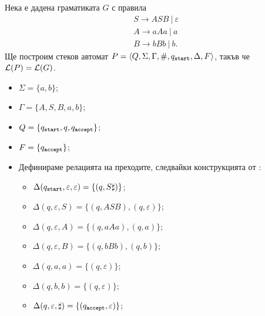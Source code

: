 \begin{example}
  Нека е дадена граматиката $G$ с правила 
  \begin{align*}
    & S \to ASB\ |\ \varepsilon\\
    & A \to aAa\ |\ a\\
    & B \to bBb\ |\ b.
  \end{align*}
  Ще построим стеков автомат $P = \langle{Q,\Sigma,\Gamma,\#,q_{\texttt{start}},\Delta,F}\rangle$, такъв че $\mathcal{L}(P) = \mathcal{L}(G)$.
  \begin{itemize}
  \item
    $\Sigma = \{a,b\}$;
  \item 
    $\Gamma = \{A,S,B,a,b\}$;
  \item
    $Q = \{q_{\texttt{start}},q,q_{\texttt{accept}}\}$;
  \item
    $F = \{q_{\texttt{accept}}\}$;
  \item
    Дефинираме релацията на преходите, следвайки конструкцията от :
    \begin{itemize}
    \item
      $\Delta(q_{\texttt{start}},\varepsilon,\varepsilon) = \{(q,S\sharp)\}$;
    \item 
      $\Delta(q,\varepsilon, S) = \{(q,ASB), (q,\varepsilon)\}$;
    \item
      $\Delta(q, \varepsilon, A) = \{(q, aAa), (q, a)\}$;
    \item
      $\Delta(q, \varepsilon, B) = \{(q, bBb), (q, b)\}$;
    \item
      $\Delta(q, a, a) = \{(q,\varepsilon)\}$;
    \item
      $\Delta(q, b, b) = \{(q,\varepsilon)\}$;
    \item
      $\Delta(q, \varepsilon, \sharp) = \{ (q_{\texttt{accept}},\varepsilon)\}$;
    \end{itemize}
  \end{itemize}
\end{example}


